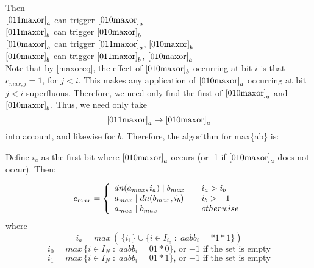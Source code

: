 \documentclass{article}
\begin{document}
Then\\
$\eqref{011maxor}_a$ \quad can trigger \quad $\eqref{010maxor}_a$\\
$\eqref{011maxor}_b$ \quad can trigger \quad $\eqref{010maxor}_b$\\
$\eqref{010maxor}_a$ \quad can trigger \quad $\eqref{011maxor}_a$,
$\eqref{010maxor}_b$ \\
$\eqref{010maxor}_b$ \quad can trigger \quad $\eqref{011maxor}_b$,
$\eqref{010maxor}_a$ \\

Note that by \eqref{maxoreq}, the effect of $\eqref{010maxor}_b$ 
occurring at bit $i$ is that $c_{max,j} = 1$, for $j<i$. 
This makes any
application of $\eqref{010maxor}_a$ occurring at bit $j<i$ superfluous.
Therefore, we need only find the first of $\eqref{010maxor}_a$ and 
$\eqref{010maxor}_b$.
Thus, we need only take 
\begin{equation*} 
\eqref{011maxor}_a \rightarrow \eqref{010maxor}_a
\end{equation*}
into account, and likewise for $b$.
Therefore, the algorithm for max\{a\text{\textbar}b\} is:
\vspace{10pt}

Define $i_a$ as the first bit where $\eqref{010maxor}_a$ occurs (or -1 if
$\eqref{010maxor}_a$ does not occur). Then:

\begin{equation*}
c_{max} = \left\{
\begin{array}{l l}
dn(a_{max},i_a) \;\text{\textbar}\; b_{max} & \quad i_a > i_b \\
a_{max} \;\text{\textbar}\; dn(b_{max},i_b) & \quad i_b > -1 \\ 
a_{max} \;\text{\textbar}\; b_{max}         & \quad otherwise
\end{array}\right.
\end{equation*}
    where
\begin{equation*}
i_a = 
max \, ( \, \{i_1\} \cup 
\{ i \in I_{i_0} \; : \; aabb_i = *1*1\} )
\end{equation*}
\begin{equation*}
i_0 = max \, \{i \in I_N\; : \; 
aabb_i = 01*0\},\,
\text{or $-1$ if the set is empty}
\end{equation*}
\begin{equation*}
i_1 = max \, \{i\in I_N\; : \; 
aabb_i = 01*1\},\,
\text{or $-1$ if the set is empty}
\end{equation*}
\vspace{0pt}
\end{document}

